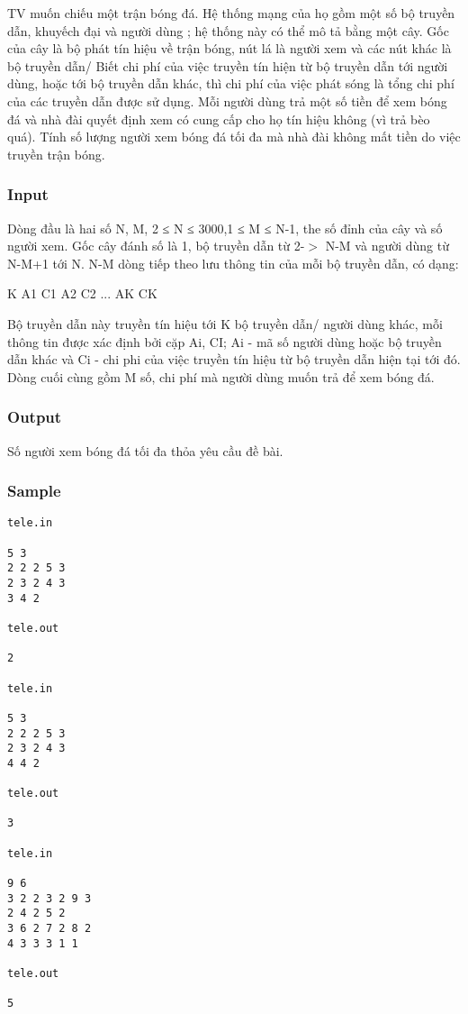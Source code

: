 



   TV muốn chiếu một trận bóng đá. Hệ thống mạng của họ gồm một số bộ  truyền dẫn, khuyếch đại và người dùng ; hệ thống này có thể mô tả bằng  một cây.    Gốc của cây là bộ phát tín hiệu về trận bóng, nút lá là người xem và các  nút khác là bộ truyền dẫn/ Biết chi phí của việc truyền tín hiện từ bộ truyền dẫn tới người dùng,  hoặc tới bộ truyền dẫn khác, thì chi phí của việc phát sóng là tổng chi phí  của các truyền dẫn được sử dụng. Mỗi người dùng trả một số tiền để xem bóng đá và nhà đài quyết định xem có  cung cấp cho họ tín hiệu không (vì trả bèo quá). Tính số lượng người xem bóng đá tối đa mà nhà đài không mất tiền do  việc truyền trận bóng.  

\subsubsection{   Input  }

   Dòng đầu là hai số N, M, 2 ≤ N ≤ 3000,1 ≤ M ≤ N-1, the số đỉnh của cây  và số người xem. Gốc cây đánh số là 1, bộ truyền dẫn từ 2-$>$ N-M và người dùng từ N-M+1 tới N.  N-M dòng tiếp theo lưu thông tin của mỗi bộ truyền dẫn, có dạng:  

   K A1 C1 A2 C2 ... AK CK  

   Bộ truyền dẫn này truyền tín hiệu tới K bộ truyền dẫn/ người dùng khác,  mỗi thông tin được xác định bởi cặp Ai, CI; Ai - mã số người dùng hoặc  bộ truyền dẫn khác và Ci - chi phi của việc truyền tín hiệu từ bộ truyền  dẫn hiện tại tới đó. Dòng cuối cùng gồm M số, chi phí mà người dùng muốn trả để xem bóng đá.  

\subsubsection{   Output  }

   Số người xem bóng đá tối đa thỏa yêu cầu đề bài.  

\subsubsection{   Sample  }
\begin{verbatim}
tele.in 
 
5 3 
2 2 2 5 3 
2 3 2 4 3 
3 4 2 
 
tele.out 
 
2 

tele.in 
 
5 3 
2 2 2 5 3 
2 3 2 4 3 
4 4 2 
 
tele.out 
 
3 

tele.in 
 
9 6 
3 2 2 3 2 9 3 
2 4 2 5 2 
3 6 2 7 2 8 2 
4 3 3 3 1 1 
 
tele.out 
 
5
\end{verbatim}